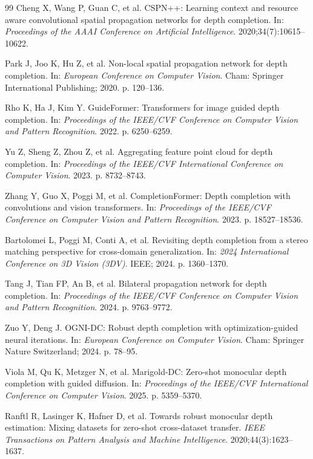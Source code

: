 \documentclass[pdflatex,sn-mathphys-num]{sn-jnl}
\begin{document}
\begin{thebibliography}{99}
Cheng X, Wang P, Guan C, et al. CSPN++: Learning context and resource aware convolutional spatial propagation networks for depth completion. In: \textit{Proceedings of the AAAI Conference on Artificial Intelligence}. 2020;34(7):10615--10622.

Park J, Joo K, Hu Z, et al. Non-local spatial propagation network for depth completion. In: \textit{European Conference on Computer Vision}. Cham: Springer International Publishing; 2020. p. 120--136.

Rho K, Ha J, Kim Y. GuideFormer: Transformers for image guided depth completion. In: \textit{Proceedings of the IEEE/CVF Conference on Computer Vision and Pattern Recognition}. 2022. p. 6250--6259.

Yu Z, Sheng Z, Zhou Z, et al. Aggregating feature point cloud for depth completion. In: \textit{Proceedings of the IEEE/CVF International Conference on Computer Vision}. 2023. p. 8732--8743.

Zhang Y, Guo X, Poggi M, et al. CompletionFormer: Depth completion with convolutions and vision transformers. In: \textit{Proceedings of the IEEE/CVF Conference on Computer Vision and Pattern Recognition}. 2023. p. 18527--18536.

Bartolomei L, Poggi M, Conti A, et al. Revisiting depth completion from a stereo matching perspective for cross-domain generalization. In: \textit{2024 International Conference on 3D Vision (3DV)}. IEEE; 2024. p. 1360--1370.

Tang J, Tian FP, An B, et al. Bilateral propagation network for depth completion. In: \textit{Proceedings of the IEEE/CVF Conference on Computer Vision and Pattern Recognition}. 2024. p. 9763--9772.

Zuo Y, Deng J. OGNI-DC: Robust depth completion with optimization-guided neural iterations. In: \textit{European Conference on Computer Vision}. Cham: Springer Nature Switzerland; 2024. p. 78--95.

Viola M, Qu K, Metzger N, et al. Marigold-DC: Zero-shot monocular depth completion with guided diffusion. In: \textit{Proceedings of the IEEE/CVF International Conference on Computer Vision}. 2025. p. 5359--5370.

Ranftl R, Lasinger K, Hafner D, et al. Towards robust monocular depth estimation: Mixing datasets for zero-shot cross-dataset transfer. \textit{IEEE Transactions on Pattern Analysis and Machine Intelligence}. 2020;44(3):1623--1637.


\end{thebibliography}
\end{document}

